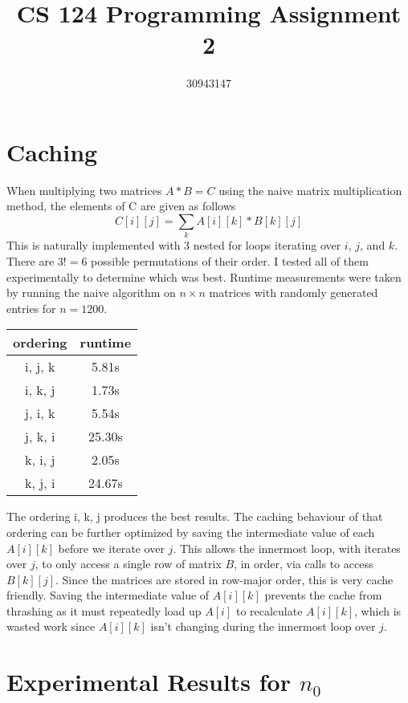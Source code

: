 \documentclass{article}
\begin{document}
\title{CS 124 Programming Assignment 2}
\author{30943147}
\maketitle
\section*{Caching}
When multiplying two matrices $A*B=C$ using the naive matrix multiplication method, the elements of C are given as follows
$$C[i][j] = \sum\limits_k A[i][k]*B[k][j]$$
This is naturally implemented with 3 nested for loops iterating over $i$, $j$, and $k$. There are $3!=6$ possible permutations of their order. I tested all of them experimentally to determine which was best. Runtime measurements were taken by running the naive algorithm on $n \times n$ matrices with randomly generated entries for $n=1200$. 
\begin{center}
\begin{tabular}{ |c|c| } 
 \hline
 ordering & runtime\\ 
\hline
 i, j, k &  5.81s \\ 
\hline
 i, k, j & 1.73s \\ 
\hline
j, i, k & 5.54s \\
\hline
j, k, i & 25.30s\\
\hline
k, i, j & 2.05s \\
k, j, i & 24.67s\\
 \hline
\end{tabular}
\end{center}
The ordering i, k, j produces the best results. The caching behaviour of that ordering can be further optimized by saving the intermediate value of each $A[i][k]$ before we iterate over $j$. This allows the innermost loop, with iterates over $j$, to only access a single row of matrix $B$, in order, via calls to access $B[k][j]$. Since the matrices are stored in row-major order, this is very cache friendly. Saving the intermediate value of $A[i][k]$ prevents the cache from thrashing as it must repeatedly load up $A[i]$ to recalculate $A[i][k]$, which is wasted work since $A[i][k]$ isn't changing during the innermost loop over $j$. 


\section*{Experimental Results for $n_0$}
\end{document}
